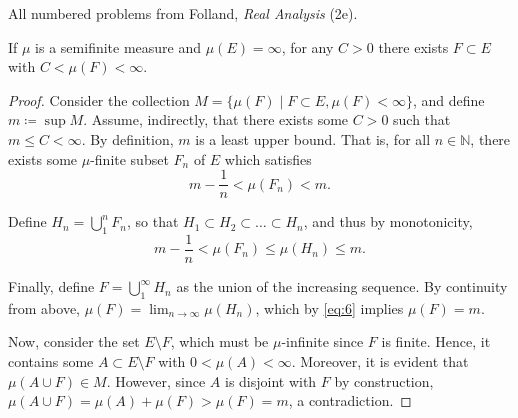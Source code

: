 \documentclass[12pt]{article}
\newenvironment{problem}[2][Problem]{\begin{trivlist}
    \item[\hskip \labelsep {\bfseries #1}\hskip \labelsep {\bfseries #2.}]}{\end{trivlist}}
\theoremstyle{definition}
\begin{document}
All numbered problems from Folland, \textit{Real Analysis} (2e).

\begin{problem}{1.3.14}
  If \(\mu\) is a semifinite measure and \(\mu(E) = \infty\), for any \( C > 0 \) there exists \( F \subset E \) with \( C < \mu(F) < \infty \).
\end{problem}
\begin{proof}
  Consider the collection \( M = \{ \mu(F) \mid F \subset E, \mu(F) < \infty \} \), and define \( m \coloneq \sup M  \).
  Assume, indirectly, that there exists some \( C > 0 \) such that \( m \leq C < \infty \).
  By definition, \( m \) is a least upper bound.
  That is, for all \( n \in \mathbb{N} \), there exists some \(\mu\)-finite subset \( F_n \) of \( E \) which satisfies
  \begin{equation}
  \label{eq:5}
  m - \frac{1}{n} < \mu(F_n) < m.
  \end{equation}

  Define \( H_n = \bigcup_1^n F_n \), so that \( H_1 \subset H_2 \subset \dots \subset H_n \), and thus by monotonicity,
  \begin{equation}
  \label{eq:6}
  m - \frac{1}{n} < \mu(F_n) \leq \mu(H_n) \leq m.
  \end{equation}

  Finally, define \( F = \bigcup_1^{\infty} H_n \) as the union of the increasing sequence.
  By continuity from above, \( \mu(F) = \lim_{n\rightarrow \infty} \mu(H_n) \), which by \cref{eq:6} implies \(\mu(F) = m\).

  Now, consider the set \( E \setminus F \), which must be \(\mu\)-infinite since \( F \) is finite.
  Hence, it contains some \( A \subset E \setminus F \) with \(0 < \mu(A) < \infty\).
  Moreover, it is evident that \( \mu(A \cup F) \in M \).
  However, since \( A \) is disjoint with \( F \) by construction, \(\mu(A\cup F) = \mu(A) + \mu(F) > \mu(F) = m\), a contradiction.

\end{proof}
\end{document}
